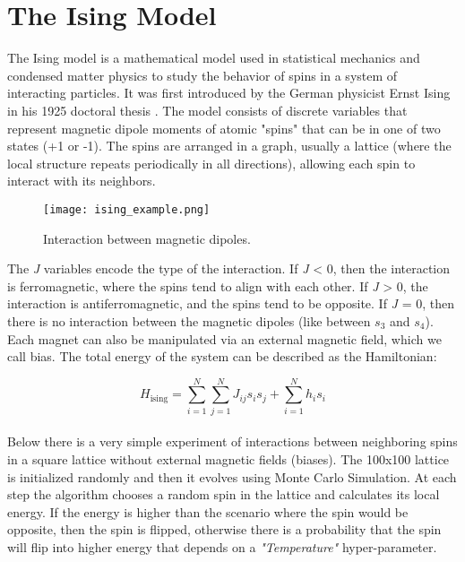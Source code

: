 \documentclass[12pt,a4paper]{report}
\begin{document}
\section{The Ising Model}

The Ising model is a mathematical model used in statistical mechanics and condensed matter physics to study the behavior of spins in a system of interacting particles. It was first introduced by the German physicist Ernst Ising in his 1925 doctoral thesis \cite{Ising_1, Ising_2, Ising_3}. The model consists of discrete variables that represent magnetic dipole moments of atomic "spins" that can be in one of two states (+1 or -1). The spins are arranged in a graph, usually a lattice (where the local structure repeats periodically in all directions), allowing each spin to interact with its neighbors.

\begin{figure}[h]
    \centering
    \texttt{[image: ising\_example.png]}
    \caption{Interaction between magnetic dipoles.}
    \label{fig:ising-example}
\end{figure}

\noindent
The \textit{J} variables encode the type of the interaction. If \textit{J} \textless{} 0, then the interaction is ferromagnetic, where the spins tend to align with each other. If \textit{J} \textgreater{} 0, the interaction is antiferromagnetic, and the spins tend to be opposite. If \textit{J} = 0, then there is no interaction between the magnetic dipoles (like between $s_3$ and $s_4$). Each magnet can also be manipulated via an external magnetic field, which we call bias. The total energy of the system can be described as the Hamiltonian:

\[
H_{\text{ising}} = \sum_{i=1}^{N} \sum_{j=1}^{N} J_{ij} s_i s_j + \sum_{i=1}^{N} h_i s_i
\]
\\

\noindent
Below there is a very simple experiment of interactions between neighboring spins in a square lattice without external magnetic fields (biases). The 100x100 lattice is initialized randomly and then it evolves using Monte Carlo Simulation. At each step the algorithm chooses a random spin in the lattice and calculates its local energy. If the energy is higher than the scenario where the spin would be opposite, then the spin is flipped, otherwise there is a probability that the spin will flip into higher energy that depends on a \textit{"Temperature"} hyper-parameter.

\newpage
\end{document}
